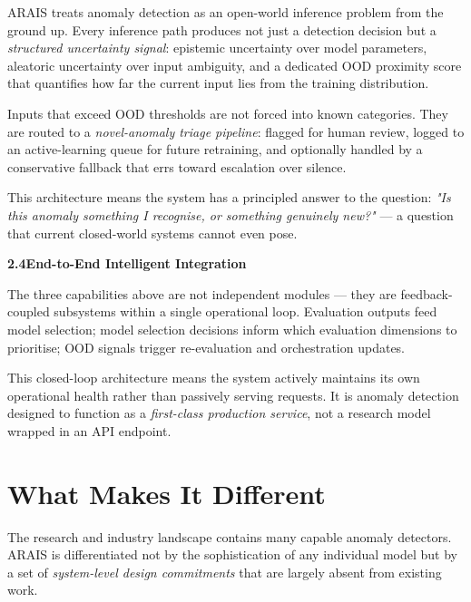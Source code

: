 \documentclass[11pt, a4paper]{article}
\newcommand{\pillar}[1]{\textbf{\textcolor{primary}{#1}}}
\begin{document}
\begin{visionbox}
ARAIS treats anomaly detection as an open-world inference problem from the ground up.
Every inference path produces not just a detection decision but a \textit{structured uncertainty signal}:
epistemic uncertainty over model parameters, aleatoric uncertainty over input ambiguity, 
and a dedicated OOD proximity score that quantifies how far the current input lies from 
the training distribution.

Inputs that exceed OOD thresholds are not forced into known categories.
They are routed to a \textit{novel-anomaly triage pipeline}: flagged for human review, 
logged to an active-learning queue for future retraining, 
and optionally handled by a conservative fallback that errs toward escalation over silence.

This architecture means the system has a principled answer to the question:
\textit{"Is this anomaly something I recognise, or something genuinely new?"} —
a question that current closed-world systems cannot even pose.
\end{visionbox}

\vspace{10pt}
\noindent\pillar{2.4\quad End-to-End Intelligent Integration}
\vspace{4pt}

\begin{visionbox}
The three capabilities above are not independent modules — they are feedback-coupled subsystems 
within a single operational loop. Evaluation outputs feed model selection;
model selection decisions inform which evaluation dimensions to prioritise;
OOD signals trigger re-evaluation and orchestration updates.

This closed-loop architecture means the system actively maintains its own 
operational health rather than passively serving requests.
It is anomaly detection designed to function as a \textit{first-class production service}, 
not a research model wrapped in an API endpoint.
\end{visionbox}

\section{What Makes It Different}

The research and industry landscape contains many capable anomaly detectors.
ARAIS is differentiated not by the sophistication of any individual model 
but by a set of \textit{system-level design commitments} that are largely absent from existing work.
\end{document}
